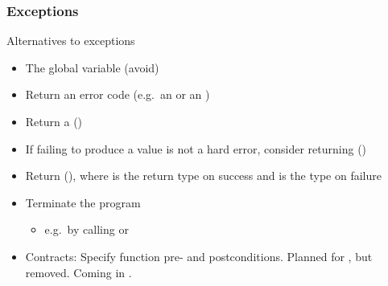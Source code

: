 \begin{advanced}
\begin{frame}[fragile]
  \frametitle{Exceptions}
  \begin{block}{Alternatives to exceptions}
    \begin{itemize}
      \item The global variable  (avoid)
      \item Return an error code (e.g.\ an  or an )
      \item Return a  ()
      \item If failing to produce a value is not a hard error, consider returning  ()
      \item Return  (), where  is the return type on success and  is the type on failure
      \item Terminate the program
        \begin{itemize}
        \item e.g.\ by calling  or 
        \end{itemize}
      \item Contracts: Specify function pre- and postconditions. Planned for , but removed. Coming in .
    \end{itemize}
  \end{block}
\end{frame}


\end{advanced}
